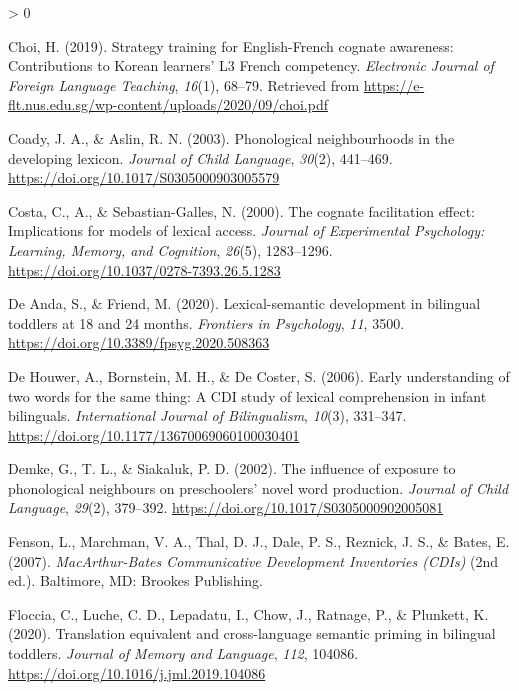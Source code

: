 \documentclass[
  english,
  ,man,floatsintext]{apa6}
\newlength{\cslhangindent}
\newenvironment{CSLReferences}[2] %
 {%
  \setlength{\parindent}{0pt}
  \ifodd #1 \everypar{\setlength{\hangindent}{\cslhangindent}}\ignorespaces\fi
  \ifnum #2 > 0
  \setlength{\parskip}{#2\baselineskip}
  \fi
 }%
 {}
\begin{document}
\begin{CSLReferences}{1}{0}
\leavevmode\hypertarget{ref-Choi_2019}{}%
Choi, H. (2019). Strategy training for {E}nglish-{F}rench cognate awareness: Contributions to {K}orean learners' L3 {F}rench competency. \emph{Electronic Journal of Foreign Language Teaching}, \emph{16}(1), 68--79. Retrieved from \url{https://e-flt.nus.edu.sg/wp-content/uploads/2020/09/choi.pdf}

\leavevmode\hypertarget{ref-Cody_Aslin_2003}{}%
Coady, J. A., \& Aslin, R. N. (2003). Phonological neighbourhoods in the developing lexicon. \emph{Journal of Child Language}, \emph{30}(2), 441--469. \url{https://doi.org/10.1017/S0305000903005579}

\leavevmode\hypertarget{ref-Costa_etal_2000}{}%
Costa, C., A., \& Sebastian-Galles, N. (2000). The cognate facilitation effect: Implications for models of lexical access. \emph{Journal of Experimental Psychology: Learning, Memory, and Cognition}, \emph{26}(5), 1283--1296. \url{https://doi.org/10.1037/0278-7393.26.5.1283}

\leavevmode\hypertarget{ref-DeAnda_Friend_2020}{}%
De Anda, S., \& Friend, M. (2020). Lexical-semantic development in bilingual toddlers at 18 and 24 months. \emph{Frontiers in Psychology}, \emph{11}, 3500. \url{https://doi.org/10.3389/fpsyg.2020.508363}

\leavevmode\hypertarget{ref-DeHouwer_etal_2006}{}%
De Houwer, A., Bornstein, M. H., \& De Coster, S. (2006). Early understanding of two words for the same thing: A {CDI} study of lexical comprehension in infant bilinguals. \emph{International Journal of Bilingualism}, \emph{10}(3), 331--347. \url{https://doi.org/10.1177/13670069060100030401}

\leavevmode\hypertarget{ref-Demke_etal_2002}{}%
Demke, G., T. L., \& Siakaluk, P. D. (2002). The influence of exposure to phonological neighbours on preschoolers' novel word production. \emph{Journal of Child Language}, \emph{29}(2), 379--392. \url{https://doi.org/10.1017/S0305000902005081}

\leavevmode\hypertarget{ref-Fenson_etal_2007}{}%
Fenson, L., Marchman, V. A., Thal, D. J., Dale, P. S., Reznick, J. S., \& Bates, E. (2007). \emph{MacArthur-{B}ates {C}ommunicative {D}evelopment {I}nventories (CDIs)} (2nd ed.). Baltimore, MD: Brookes Publishing.

\leavevmode\hypertarget{ref-Floccia_etal_2020}{}%
Floccia, C., Luche, C. D., Lepadatu, I., Chow, J., Ratnage, P., \& Plunkett, K. (2020). Translation equivalent and cross-language semantic priming in bilingual toddlers. \emph{Journal of Memory and Language}, \emph{112}, 104086. \url{https://doi.org/10.1016/j.jml.2019.104086}


\end{CSLReferences}
\end{document}
